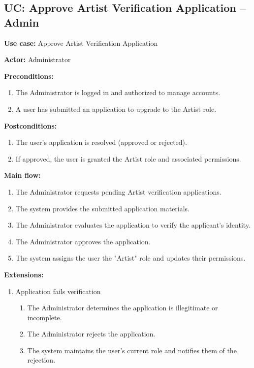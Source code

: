 \documentclass[11pt]{report}
\begin{document}
\subsection{UC: Approve Artist Verification Application -- Admin}

{\bfseries Use case:} Approve Artist Verification Application

{\bfseries Actor:} Administrator

{\bfseries Preconditions:}
\begin{enumerate}
	\item The Administrator is logged in and authorized to manage accounts.
	\item A user has submitted an application to upgrade to the Artist role.
\end{enumerate}

{\bfseries Postconditions:}
\begin{enumerate}
	\item The user's application is resolved (approved or rejected).
	\item If approved, the user is granted the Artist role and associated permissions.
\end{enumerate}

{\bfseries Main flow:}
\begin{enumerate}
	\item The Administrator requests pending Artist verification applications.
	\item The system provides the submitted application materials.
	\item The Administrator evaluates the application to verify the applicant's identity.
	\item The Administrator approves the application.
	\item The system assigns the user the "Artist" role and updates their permissions.
\end{enumerate}

{\bfseries Extensions:}
\begin{enumerate}
	\item [3a.] Application fails verification
	\begin{enumerate}
		\item [3a1.] The Administrator determines the application is illegitimate or incomplete.
		\item [3a2.] The Administrator rejects the application.
		\item [3a3.] The system maintains the user's current role and notifies them of the rejection.
	\end{enumerate}
\end{enumerate}
\end{document}
